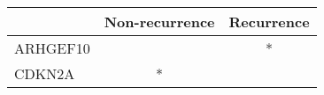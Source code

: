 \begin{tabular}{lcc}
\toprule
{} & Non-recurrence & Recurrence \\
\midrule
ARHGEF10 &                &          * \\
CDKN2A   &              * &            \\
\bottomrule
\end{tabular}
